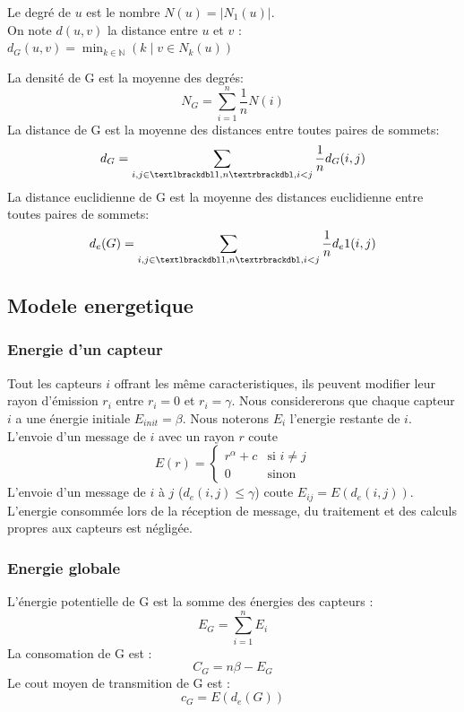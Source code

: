 \begin{mydef}
 Le degré de $ u $ est le nombre  $N(u)=|N_1(u)|$.\\
 On note $d(u,v)$ la distance entre $ u $ et $ v $ : $d_G(u,v)= \min_{k \in \mathbb{N}}(k \mid v \in N_k(u))$
\end{mydef}

\begin{mydef}%
 La densité de G est la moyenne des degrés:$$N_G=\sum_{i=1}^n{\frac1n N(i)}$$
 La distance de G est la moyenne des distances entre toutes paires de sommets:$$d_G=\sum_{i,j\in \textlbrackdbl 1,n \textrbrackdbl,i<j}{\frac1n d_G(i,j)}$$
 La distance euclidienne de G est la moyenne des distances euclidienne entre toutes paires de sommets:$$d_e(G)=\sum_{i,j\in \textlbrackdbl 1,n \textrbrackdbl,i<j}{\frac1n d_e1(i,j)}$$

\end{mydef}

\subsection{Modele energetique}
\subsubsection{Energie d'un capteur}
Tout les capteurs $i$ offrant les même caracteristiques, ils peuvent modifier leur rayon d'émission $r_i$ entre $r_i=0$ et $r_i=\gamma$.
Nous considererons que chaque capteur $i$ a une énergie initiale $E_{init}=\beta$.
Nous noterons $E_i$ l'energie restante de $i$.
L'envoie d'un message de $i$ avec un rayon $r$ coute $$E(r)=\begin{cases} r^\alpha + c & \text{si }i\neq j \\ 0 & \text{sinon}  \end{cases}$$
L'envoie d'un message de $i$ à $j$ ($d_e(i,j)\leq \gamma$) coute  $ E_{ij}=E(d_e(i,j))$.
L'energie consommée lors de la réception de message, du traitement et des calculs propres aux capteurs est négligée.


\subsubsection{Energie globale}
\begin{mydef}
 L'énergie potentielle de G est la somme des énergies des capteurs :$$E_G=\sum_{i=1}^n{E_i}$$
 La consomation de  G est :$$C_G=n\beta - E_G$$
 Le cout moyen de transmition de  G est :$$c_G=E(d_e(G))$$

\end{mydef}

